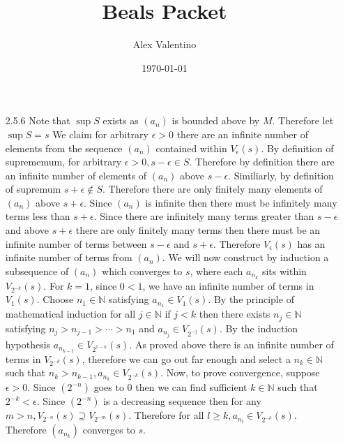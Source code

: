 \documentclass[12pt, letterpaper]{article}
\date{\today}
\author{Alex Valentino}
\title{Beals Packet}
\newcommand{\N}{\mathbb{N}}
\begin{document}
\begin{enumerate}
	\item[2.5.6]
		Note that $\sup S$ exists as $(a_n)$ is bounded above by $M$. 
		Therefore let $\sup S = s$ We claim for arbitrary $\epsilon > 0$ there are
		an infinite number of elements from the 
		sequence $(a_n)$ contained within $V_\epsilon (s)$.  
		By definition of suprememum, for arbitrary $\epsilon > 0, s-\epsilon \in S$.  Therefore by definition there are an infinite number of elements of $(a_n)$
		above $s-\epsilon$.  Similiarly, by definition of supremum $s + \epsilon \not \in S$.  Therefore there are only finitely many elements of $(a_n)$ above $s+ \epsilon$.  Since $(a_n)$ is infinite then there must be infinitely many terms less than $s+ \epsilon$.  Since there are infinitely many terms greater than $s-\epsilon$ and above $s+ \epsilon$ there are only finitely many terms then there
		must be an infinite number of terms between $s-\epsilon$ and $s+\epsilon$.  
		Therefore $V_\epsilon (s)$ has an infinite number of terms from $(a_n)$.  
		We will now construct by induction a subsequence of $(a_n)$ which converges to $s$, where each $a_{n_k}$ sits within $V_{2^{-k}}(s)$.  For $k=1$, since $0 < 1$, we have an infinite 
		number of terms in $V_1 (s)$.  Choose $n_1 \in \N$ satisfying $a_{n_1} \in V_1 (s)$.  By the principle of mathematical induction for all $j \in \N$ if $j < k$ then there exists $n_j \in \N$ satisfying $n_j > n_{j-1} > \cdots > n_1$ and 
		$a_{n_j} \in V_{2^{-j}}(s)$.  By the induction hypothesis $a_{n_{k-1}} \in V_{2^{1-k}}(s)$.  As proved above there is an infinite number of terms in $V_{2^{-k}}(s)$, therefore we can go out far enough and select a $n_k \in \N$ such that 
		$n_k > n_{k-1}, a_{n_k} \in V_{2^{-k}}(s)$.  Now, to prove convergence, 
		suppose $\epsilon > 0$.  Since $(2^{-n})$ goes to 0 then we can find sufficient $k \in \N$ such that $2^{-k} < \epsilon$.  Since $(2^{-n})$ is a decreasing sequence then for any $m > n, V_{2^{-n}}(s) \supseteq V_{2^{-m}}(s)$.  Therefore for all $l \geq k, a_{n_l} \in V_{2^{-k}}(s)$.  Therefore $(a_{n_k})$ converges to $s$.  
		
\end{enumerate}
\end{document}
